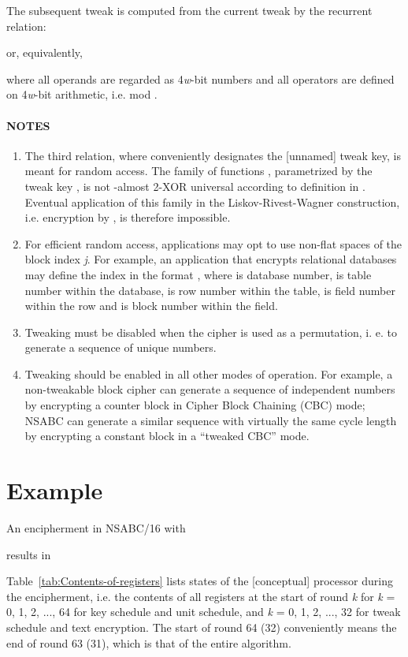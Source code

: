 \documentclass[a4paper,oneside,english]{amsart}
\numberwithin{equation}{section}
\numberwithin{figure}{section}
\begin{document}
The subsequent tweak is computed from the current tweak by the recurrent
relation:




or, equivalently,


 

where all operands are regarded as 4\emph{w}-bit numbers and all operators
are defined on 4\emph{w}-bit arithmetic, i.e. mod .


\paragraph*{NOTES}
\begin{enumerate}
\item The third relation, where  conveniently designates the {[}unnamed{]}
tweak key, is meant for random access. The family of functions ,
parametrized by the tweak key , is not -almost
2-XOR universal according to definition in \cite{LRW02}. Eventual
application of this family in the Liskov-Rivest-Wagner construction,
i.e. encryption by ,
is therefore impossible.
\item For efficient random access, applications may opt to use non-flat
spaces of the block index \emph{j}. For example, an application that
encrypts relational databases may define the index in the format ,
where  is database number,  is table number within
the database,  is row number within the table,  is
field number within the row and  is block number within the
field.
\item Tweaking must be disabled when the cipher is used as a permutation,
i. e. to generate a sequence of unique numbers.
\item Tweaking should be enabled in all other modes of operation. For example,
a non-tweakable block cipher can generate a sequence of independent
numbers by encrypting a counter block in Cipher Block Chaining (CBC)
mode; NSABC can generate a similar sequence with virtually the same
cycle length by encrypting a constant block in a {}``tweaked CBC''
mode.
\end{enumerate}

\section{Example}

An encipherment in NSABC/16 with




results in




Table~\ref{tab:Contents-of-registers} lists states of the {[}conceptual{]}
processor during the encipherment, i.e. the contents of all registers
at the start of round \emph{k} for \emph{k} = 0, 1, 2, ..., 64 for
key schedule and unit schedule, and \emph{k} = 0, 1, 2, ..., 32 for
tweak schedule and text encryption. The start of round 64 (32) conveniently
means the end of round 63 (31), which is that of the entire algorithm.
\end{document}
